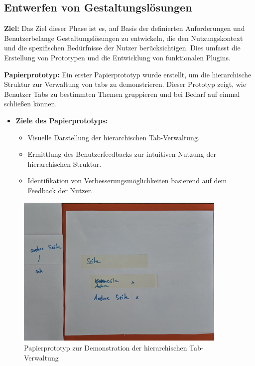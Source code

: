 \subsection{Entwerfen von Gestaltungslösungen}

\textbf{Ziel:}
Das Ziel dieser Phase ist es, auf Basis der definierten Anforderungen und Benutzerbelange Gestaltungslösungen zu entwickeln, die den Nutzungskontext und die spezifischen Bedürfnisse der Nutzer berücksichtigen. Dies umfasst die Erstellung von Prototypen und die Entwicklung von funktionalen Plugins.

\textbf{Papierprototyp:}
Ein erster Papierprototyp wurde erstellt, um die hierarchische Struktur zur Verwaltung von \gls{tab}s zu demonstrieren. Dieser Prototyp zeigt, wie Benutzer Tabs zu bestimmten Themen gruppieren und bei Bedarf auf einmal schließen können.

\begin{itemize}
    \item \textbf{Ziele des Papierprototyps:}
    \begin{itemize}
        \item Visuelle Darstellung der hierarchischen Tab-Verwaltung.
        \item Ermittlung des Benutzerfeedbacks zur intuitiven Nutzung der hierarchischen Struktur.
        \item Identifikation von Verbesserungsmöglichkeiten basierend auf dem Feedback der Nutzer.
    \end{itemize}
\end{itemize}

\begin{figure}[H]
    \caption{Papierprototyp zur Demonstration der hierarchischen Tab-Verwaltung}
    \includegraphics[width=0.9\textwidth]{abbildungen/papierprototyp.jpg}
    \end{figure}

